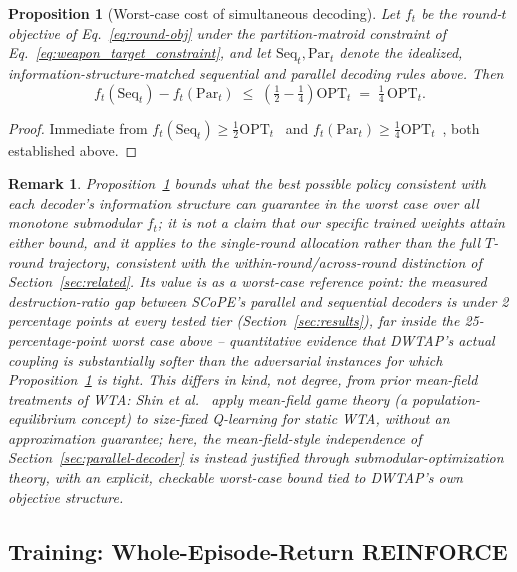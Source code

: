 \documentclass[smallcondensed]{svjour3}
\newtheorem{proposition}{Proposition}
\newtheorem{remark}{Remark}
\begin{document}
\begin{proposition}[Worst-case cost of simultaneous decoding]
\label{prop:submodular-gap}
Let $f_t$ be the round-$t$ objective of Eq.~\eqref{eq:round-obj} under the partition-matroid constraint of Eq.~\eqref{eq:weapon_target_constraint}, and let $\mathrm{Seq}_t,\mathrm{Par}_t$ denote the idealized, information-structure-matched sequential and parallel decoding rules above. Then
\begin{equation}
f_t(\mathrm{Seq}_t) - f_t(\mathrm{Par}_t) \;\leq\; \left(\tfrac12-\tfrac14\right)\text{OPT}_t \;=\; \tfrac14\,\text{OPT}_t.
\end{equation}
\end{proposition}
\begin{proof}
Immediate from $f_t(\mathrm{Seq}_t)\geq\frac12\text{OPT}_t$~\cite{fisher1978analysis} and $f_t(\mathrm{Par}_t)\geq\frac14\text{OPT}_t$~\cite{barbosa2015power,mirzasoleiman2016distributed}, both established above.
\end{proof}

\begin{remark}
Proposition~\ref{prop:submodular-gap} bounds what the \emph{best possible} policy consistent with each decoder's information structure can guarantee in the worst case over all monotone submodular $f_t$; it is not a claim that our specific trained weights attain either bound, and it applies to the single-round allocation rather than the full $T$-round trajectory, consistent with the within-round/across-round distinction of Section~\ref{sec:related}. Its value is as a worst-case reference point: the measured destruction-ratio gap between SCoPE's parallel and sequential decoders is under 2 percentage points at every tested tier (Section~\ref{sec:results}), far inside the 25-percentage-point worst case above -- quantitative evidence that DWTAP's actual coupling is substantially softer than the adversarial instances for which Proposition~\ref{prop:submodular-gap} is tight. This differs in kind, not degree, from prior mean-field treatments of WTA: Shin et al.~\cite{shin2020mean} apply mean-field \emph{game} theory (a population-equilibrium concept) to size-fixed Q-learning for static WTA, without an approximation guarantee; here, the mean-field-style independence of Section~\ref{sec:parallel-decoder} is instead justified through submodular-optimization theory, with an explicit, checkable worst-case bound tied to DWTAP's own objective structure.
\end{remark}

\subsection{Training: Whole-Episode-Return REINFORCE}
\label{sec:training}
\end{document}
